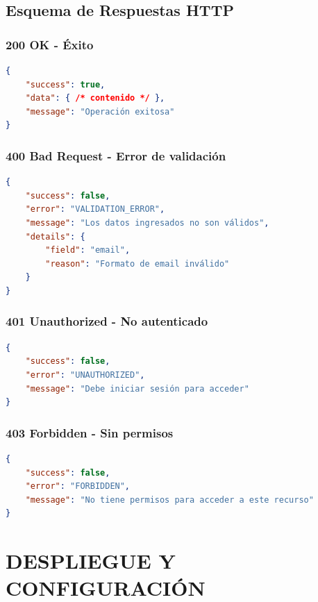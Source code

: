 \documentclass[12pt, a4paper]{report}
\begin{document}
\section{Esquema de Respuestas HTTP}

\subsection{200 OK - Éxito}
\begin{lstlisting}[language=JSON]
{
    "success": true,
    "data": { /* contenido */ },
    "message": "Operación exitosa"
}
\end{lstlisting}

\subsection{400 Bad Request - Error de validación}
\begin{lstlisting}[language=JSON]
{
    "success": false,
    "error": "VALIDATION_ERROR",
    "message": "Los datos ingresados no son válidos",
    "details": {
        "field": "email",
        "reason": "Formato de email inválido"
    }
}
\end{lstlisting}

\subsection{401 Unauthorized - No autenticado}
\begin{lstlisting}[language=JSON]
{
    "success": false,
    "error": "UNAUTHORIZED",
    "message": "Debe iniciar sesión para acceder"
}
\end{lstlisting}

\subsection{403 Forbidden - Sin permisos}
\begin{lstlisting}[language=JSON]
{
    "success": false,
    "error": "FORBIDDEN",
    "message": "No tiene permisos para acceder a este recurso"
}
\end{lstlisting}

\chapter{DESPLIEGUE Y CONFIGURACIÓN}
\end{document}
